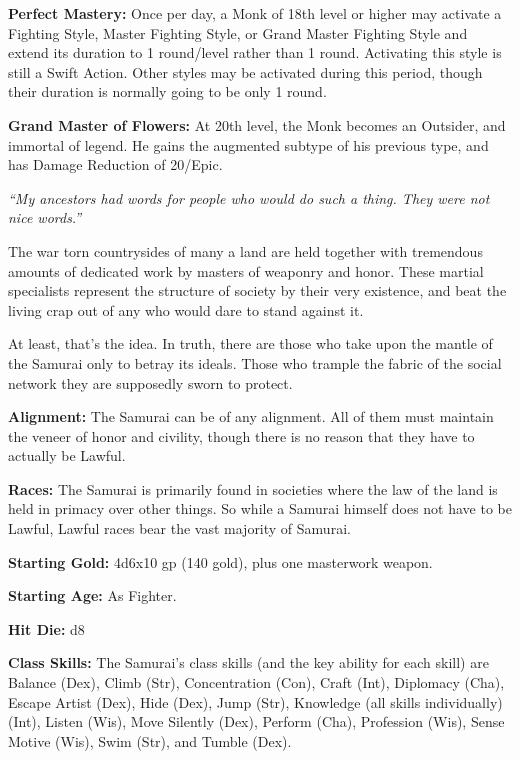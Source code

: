 \documentclass[10pt]{article}
\newcommand{\ability}[2]{\smallskip \noindent \textbf{#1} #2}
\newcommand{\classname}[1]{\noindent{\huge \textbf{#1}}}
\newcommand{\quot}[1]{\emph{#1}\medskip}
\newcommand{\desc}[1]{#1 \medskip}
\begin{document}
\ability{Perfect Mastery:}{Once per day, a Monk of 18th level or higher may activate a Fighting Style, Master Fighting Style, or Grand Master Fighting Style and extend its duration to 1 round/level rather than 1 round. Activating this style is still a Swift Action. Other styles may be activated during this period, though their duration is normally going to be only 1 round.}

\ability{Grand Master of Flowers:}{At 20th level, the Monk becomes an Outsider, and immortal of legend. He gains the augmented subtype of his previous type, and has Damage Reduction of 20/Epic.}

\newpage

\classname{Samurai}

\quot{``My ancestors had words for people who would do such a thing. They were not nice words.''}

\desc{The war torn countrysides of many a land are held together with tremendous amounts of dedicated work by masters of weaponry and honor. These martial specialists represent the structure of society by their very existence, and beat the living crap out of any who would dare to stand against it.}

\desc{At least, that's the idea. In truth, there are those who take upon the mantle of the Samurai only to betray its ideals. Those who trample the fabric of the social network they are supposedly sworn to protect.}

\ability{Alignment:}{The Samurai can be of any alignment. All of them must maintain the veneer of honor and civility, though there is no reason that they have to actually be Lawful.}

\ability{Races:}{The Samurai is primarily found in societies where the law of the land is held in primacy over other things. So while a Samurai himself does not have to be Lawful, Lawful races bear the vast majority of Samurai.}

\ability{Starting Gold:}{4d6x10 gp (140 gold), plus one masterwork weapon.}

\ability{Starting Age:}{As Fighter.}

\ability{Hit Die:}{d8}

\ability{Class Skills:}{The Samurai's class skills (and the key ability for each skill) are Balance (Dex), Climb (Str), Concentration (Con), Craft (Int), Diplomacy (Cha), Escape Artist (Dex), Hide (Dex), Jump (Str), Knowledge (all skills individually) (Int), Listen (Wis), Move Silently (Dex), Perform (Cha), Profession (Wis), Sense Motive (Wis), Swim (Str), and Tumble (Dex).}
\end{document}
